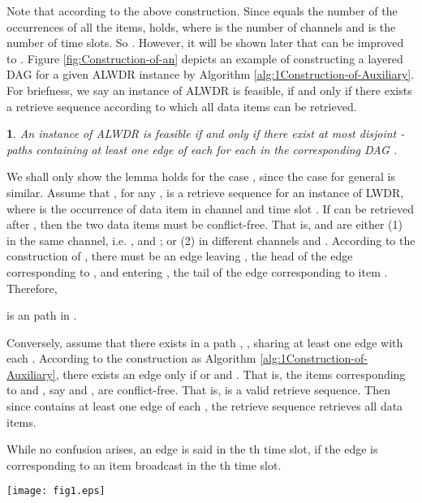 \documentclass[11pt,english,onecolumn,draftcls]{IEEEtran}
\theoremstyle{plain}
\theoremstyle{plain}
\theoremstyle{plain}
\newtheorem{lem}[thm]{\protect\lemmaname}
\theoremstyle{plain}
\providecommand{\lemmaname}{Lemma}
\begin{document}
Note that  according to the
above construction. Since  equals the number of
the occurrences of all the items,  holds,
where  is the number of channels and  is the number of time
slots. So . However, it will be shown
later that  can be improved to .
Figure \ref{fig:Construction-of-an} depicts an example of constructing
a layered DAG for a given ALWDR instance by Algorithm \ref{alg:1Construction-of-Auxiliary}.
For briefness, we say an instance of ALWDR is feasible, if
and only if there exists a retrieve sequence according to which all
data items can be retrieved.
\begin{lem}
\label{lem:lwdtokpath}An instance of ALWDR is feasible if
and only if there exist at most  disjoint -paths containing
at least one edge of each  for each  in the corresponding
DAG .\end{lem}
\begin{IEEEproof}
We shall only show the lemma holds for the case , since
the case for general  is similar. Assume that ,
 for any , is a retrieve sequence for an instance
of LWDR, where  is the occurrence of
data item  in channel  and time slot .
If  can be retrieved after ,
then the two data items must be conflict-free. That is, 
and  are either (1) in the same channel,
i.e. , and ; or (2) in different channels
and . According to the construction of ,
there must be an edge leaving , the
head of the edge corresponding to ,
and entering , the tail of the
edge corresponding to item . Therefore,

is an  path in .

Conversely, assume that there exists in  a path  ,
, sharing at least one edge with each .
According to the construction as Algorithm \ref{alg:1Construction-of-Auxiliary},
there exists an edge 
only if  or  and .
That is, the items corresponding to 
and ,
say  and ,
are conflict-free. That is, 
is a valid retrieve sequence. Then since  contains at least one
edge of each , the retrieve sequence retrieves all data
items.
\end{IEEEproof}
While no confusion arises, an edge is said in the th time slot,
if the edge is corresponding to an item broadcast in the th time
slot.

\begin{figure*}
\texttt{[image: fig1.eps]}

\protect\caption{\label{fig:Construction-of-an}Construction of an auxiliary DAG for
an instance of LWDR: (a) An instance of LWDR; (b) The corresponding
auxiliary DAG. }
\end{figure*}
\end{document}
